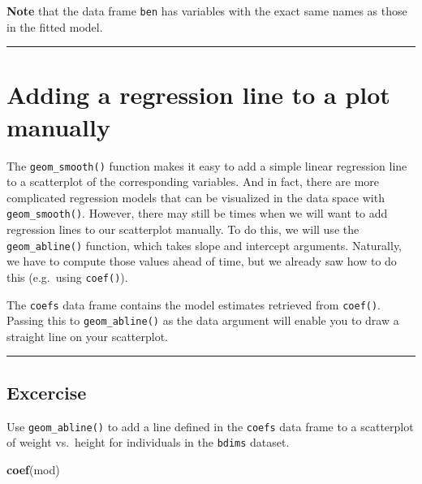 \documentclass[
]{book}
\newenvironment{Shaded}{\begin{snugshade}}{\end{snugshade}}
\newcommand{\KeywordTok}[1]{\textcolor[rgb]{0.13,0.29,0.53}{\textbf{#1}}}
\newcommand{\NormalTok}[1]{#1}
\begin{document}
\textbf{Note} that the data frame \texttt{ben} has variables with the exact same names as those in the fitted model.

\begin{center}\rule{0.5\linewidth}{0.5pt}\end{center}

\hypertarget{adding-a-regression-line-to-a-plot-manually}{%
\section{Adding a regression line to a plot manually}\label{adding-a-regression-line-to-a-plot-manually}}

The \texttt{geom\_smooth()} function makes it easy to add a simple linear regression line to a scatterplot of the corresponding variables. And in fact, there are more complicated regression models that can be visualized in the data space with \texttt{geom\_smooth()}. However, there may still be times when we will want to add regression lines to our scatterplot manually. To do this, we will use the \texttt{geom\_abline()} function, which takes slope and intercept arguments. Naturally, we have to compute those values ahead of time, but we already saw how to do this (e.g.~using \texttt{coef()}).

The \texttt{coefs} data frame contains the model estimates retrieved from \texttt{coef()}. Passing this to \texttt{geom\_abline()} as the data argument will enable you to draw a straight line on your scatterplot.

\begin{center}\rule{0.5\linewidth}{0.5pt}\end{center}

\hypertarget{excercise-4}{%
\subsection*{Excercise}\label{excercise-4}}

Use \texttt{geom\_abline()} to add a line defined in the \texttt{coefs} data frame to a scatterplot of weight vs.~height for individuals in the \texttt{bdims} dataset.

\begin{Shaded}
\begin{Highlighting}[]
\KeywordTok{coef}\NormalTok{(mod)}
\end{Highlighting}
\end{Shaded}
\end{document}
